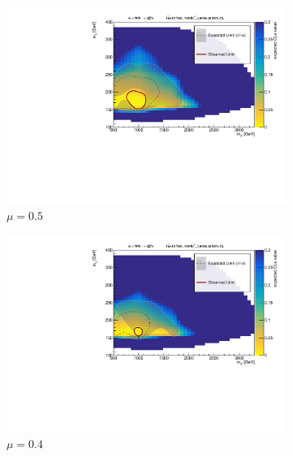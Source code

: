  \begin{figure} \ContinuedFloat
  \begin{subfigure}{0.48\textwidth}
    \includegraphics[width=\textwidth]{Figures/App_signal_strength/unblinded_mu0_5_nosig.pdf}
    \caption{\(\mu=0.5\)}\label{fig:unblinded_0.5}
  \end{subfigure} \hspace{0.3em}
  \begin{subfigure}{0.48\textwidth}
    \includegraphics[width=\textwidth]{Figures/App_signal_strength/unblinded_mu0_4_nosig.pdf}
    \caption{\(\mu=0.4\)}\label{fig:unblinded_0.4}
  \end{subfigure} \vspace{1em}  
    \begin{subfigure}{0.48\textwidth}

\end{subfigure}
\end{figure}
